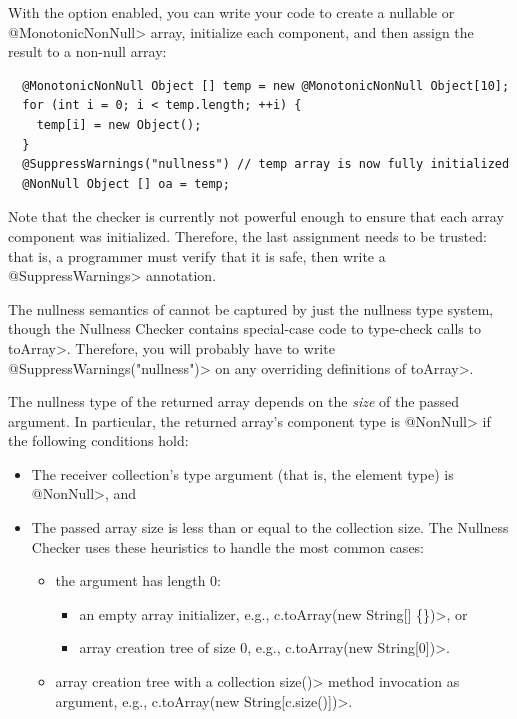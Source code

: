 With the option enabled, you can write your code to create a nullable or
\<@MonotonicNonNull> array, initialize
each component, and then assign the result to a non-null array:

\begin{Verbatim}
  @MonotonicNonNull Object [] temp = new @MonotonicNonNull Object[10];
  for (int i = 0; i < temp.length; ++i) {
    temp[i] = new Object();
  }
  @SuppressWarnings("nullness") // temp array is now fully initialized
  @NonNull Object [] oa = temp;
\end{Verbatim}

Note that the checker is currently not powerful enough to ensure that
each array component was initialized. Therefore, the last assignment
needs to be trusted:  that is, a programmer must verify that it is safe,
then write a \<@SuppressWarnings> annotation.





The nullness semantics of
cannot be captured by just the nullness type system, though the Nullness
Checker contains special-case code to type-check calls to \<toArray>.
Therefore, you will probably have to write \<@SuppressWarnings("nullness")>
on any overriding definitions of \<toArray>.

The nullness type of the
returned array depends on the \emph{size} of the passed argument. In particular, the
returned array's component type is \<@NonNull> if the following conditions
hold:

\begin{itemize}
  \item The receiver collection's type argument (that is, the element type) is \<@NonNull>, and
  \item The passed array size is less than or equal to the collection size. The
    Nullness Checker uses these heuristics to handle the most common cases:

  \begin{itemize}
    \item the argument has length 0:

      \begin{itemize}
        \item an empty array initializer, e.g., \<c.toArray(new String[] \{\})>, or

        \item array creation tree of size 0, e.g., \<c.toArray(new String[0])>.
      \end{itemize}

    \item array creation tree with a collection \<size()> method invocation as argument, e.g.,
      \<c.toArray(new String[c.size()])>.
  \end{itemize}

\end{itemize}

